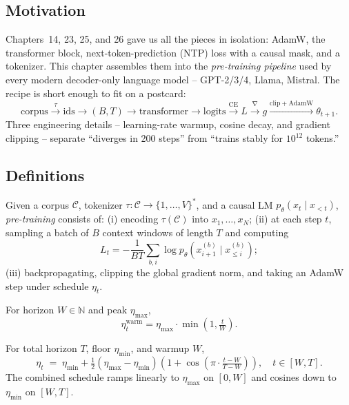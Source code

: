 \subsection*{Motivation}

Chapters~14, 23, 25, and 26 gave us all the pieces in isolation: AdamW, the transformer block, next-token-prediction (NTP) loss with a causal mask, and a tokenizer. This chapter assembles them into the \emph{pre-training pipeline} used by every modern decoder-only language model -- GPT-2/3/4, Llama, Mistral. The recipe is short enough to fit on a postcard:
\[
\text{corpus} \xrightarrow{\tau} \text{ids} \to (B,T) \to \text{transformer} \to \text{logits} \xrightarrow{\mathrm{CE}} L \xrightarrow{\nabla} g \xrightarrow{\text{clip}+\mathrm{AdamW}} \theta_{t+1}.
\]
Three engineering details -- learning-rate warmup, cosine decay, and gradient clipping -- separate ``diverges in 200 steps'' from ``trains stably for $10^{12}$ tokens.''

\subsection*{Definitions}

\begin{definition}
Given a corpus $\mathcal{C}$, tokenizer $\tau:\mathcal{C}\to\{1,\dots,V\}^*$, and a causal LM $p_\theta(x_t\mid x_{<t})$, \emph{pre-training} consists of: (i) encoding $\tau(\mathcal{C})$ into $x_1,\dots,x_N$; (ii) at each step $t$, sampling a batch of $B$ context windows of length $T$ and computing
\[
L_t = -\frac{1}{BT}\sum_{b,i}\log p_\theta(x^{(b)}_{i+1}\mid x^{(b)}_{\le i});
\]
(iii) backpropagating, clipping the global gradient norm, and taking an AdamW step under schedule $\eta_t$.
\end{definition}

\begin{definition}
For horizon $W\in\mathbb{N}$ and peak $\eta_{\max}$,
\[
\eta_t^{\text{warm}} = \eta_{\max}\cdot\min\!\left(1,\tfrac{t}{W}\right).
\]
\end{definition}

\begin{definition}
For total horizon $T$, floor $\eta_{\min}$, and warmup $W$,
\[
\eta_t \;=\; \eta_{\min} + \tfrac{1}{2}(\eta_{\max}-\eta_{\min})\!\left(1 + \cos\!\left(\pi\cdot\tfrac{t-W}{T-W}\right)\right), \quad t\in[W,T].
\]
The combined schedule ramps linearly to $\eta_{\max}$ on $[0,W]$ and cosines down to $\eta_{\min}$ on $[W,T]$.
\end{definition}

